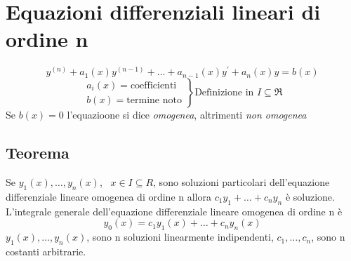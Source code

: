 \section{Equazioni differenziali lineari di ordine n}
\begin{equation}
	y^{(n)}+a_1(x)y^{(n-1)}+\dots+a_{n-1}(x)y^\prime+a_n(x)y=b(x)
\end{equation}
\begin{equation*}
	\left.
	\begin{aligned}
		 a_i(x)=\text{coefficienti}\\
		b(x)=\text{termine noto}
       	\end{aligned}
 	\right\} \text{Definizione in } I\subseteq \mathfrak{R}
\end{equation*}
Se $b(x)=0$ l'equazioone si dice \textit{omogenea}, altrimenti \textit{non omogenea}
\subsection{Teorema}
Se $y_1(x),\dots,y_n(x),\text{ }x\in I \subseteq R$, sono soluzioni particolari dell'equazione differenziale lineare omogenea di ordine n allora $c_1y_1+\dots+c_ny_n$ è soluzione.\\
L'integrale generale dell'equazione differenziale lineare omogenea di ordine n è
\begin{equation*}
	y_0(x)=c_1y_1(x)+\dots+c_ny_n(x)
\end{equation*}
$y_1(x),\dots,y_n(x)$, sono n soluzioni linearmente indipendenti, $c_1,\dots, c_n$, sono n costanti arbitrarie.
